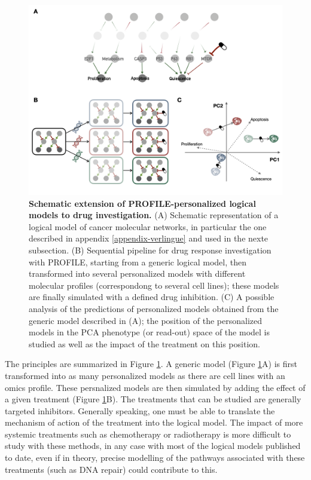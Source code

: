 \documentclass[a4paper,12pt,twoside,onecolumn,openright,final,oldfontcommands]{memoir}
\begin{document}
\begin{figure}

{\centering \includegraphics[width=0.9\linewidth]{fig/PROFILE-drug} 

}

\caption[Bimodality criteria and their combinations]{\textbf{Schematic extension of
PROFILE-personalized logical models to drug investigation.} (A)
Schematic representation of a logical model of cancer molecular
networks, in particular the one described in appendix
\ref{appendix-verlingue} and used in the nexte subsection. (B)
Sequential pipeline for drug response investigation with PROFILE,
starting from a generic logical model, then transformed into several
personalized models with different molecular profiles (correspondong to
several cell lines); these models are finally simulated with a defined
drug inhibition. (C) A possible analysis of the predictions of
personalized models obtained from the generic model described in (A);
the position of the personalized models in the PCA phenotype (or
read-out) space of the model is studied as well as the impact of the
treatment on this position.}\label{fig:PROFILE-drug}
\end{figure}
















The principles are summarized in Figure \ref{fig:PROFILE-drug}. A
generic model (Figure \ref{fig:PROFILE-drug}A) is first transformed into
as many personalized models as there are cell lines with an omics
profile. These persnalized models are then simulated by adding the
effect of a given treatment (Figure \ref{fig:PROFILE-drug}B). The
treatments that can be studied are generally targeted inhibitors.
Generally speaking, one must be able to translate the mechanism of
action of the treatment into the logical model. The impact of more
systemic treatments such as chemotherapy or radiotherapy is more
difficult to study with these methods, in any case with most of the
logical models published to date, even if in theory, precise modelling
of the pathways associated with these treatments (such as DNA repair)
could contribute to this.
\end{document}
